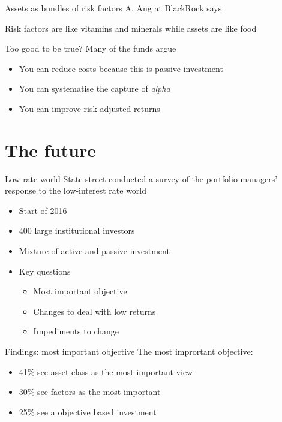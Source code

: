 \documentclass[14pt,xcolor=pdftex,dvipsnames,table]{beamer}\usepackage[]{graphicx}\usepackage[]{color}
\begin{document}
\begin{frame}{Assets as bundles of risk factors}
A. Ang at BlackRock says 
\pause
\begin{block}{}
Risk factors are like vitamins and minerals while assets are like food
\end{block}
\end{frame}

\begin{frame}{Too good to be true?}
Many of the funds argue 
\begin{itemize}[<+-| alert@+>]
\pause
\item You can reduce costs because this is passive investment
\item You can systematise the capture of \emph{alpha}
\item You can improve risk-adjusted returns
\end{itemize}
\end{frame}

\section{The future}
\begin{frame}{Low rate world}
State street conducted a survey of the portfolio managers' response to the low-interest rate world
\begin{itemize}[<+-| alert@+>]
\pause
\item Start of 2016
\item 400 large institutional investors
\item Mixture of active and passive investment
\item Key questions 
\begin{itemize}
\item Most important objective
\item Changes to deal with low returns
\item Impediments to change
\end{itemize}
\end{itemize}
\end{frame}

\begin{frame}{Findings: most important objective}
The most imprortant objective:
\begin{itemize}[<+-| alert@+>]
\pause
\item 41\% see asset class as the most important view
\item 30\% see factors as the most important
\item 25\% see a objective based investment
\end{itemize}
\end{frame}
\end{document}
